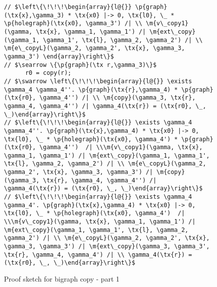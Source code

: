 \begin{figure}
\begin{lstlisting}
// $\left\{\!\!\!\begin{array}{l@{}} \p{graph}(\tx{x},\gamma_3) * \tx{x0} |-> 0, \tx{l0}, \_ * \p{holegraph}(\tx{x0}, \gamma_3') /| \\ \m{v\_copy1}(\gamma, \tx{x}, \gamma_1, \gamma_1') /| \m{ext\_copy}(\gamma_1, \gamma_1', \tx{l}, \gamma_2, \gamma_2') /| \\ \m{e\_copyL}(\gamma_2, \gamma_2', \tx{x}, \gamma_3, \gamma_3') \end{array}\right\}$
// $\searrow \{\p{graph}(\tx r,\gamma_3)\}$
      r0 = copy(r);
// $\swarrow \left\{\!\!\!\begin{array}{l@{}} \exists \gamma_4 \gamma_4''. \p{graph}(\tx{r},\gamma_4) * \p{graph}(\tx{r0}, \gamma_4'') /| \\ \m{copy}(\gamma_3, \tx{r}, \gamma_4, \gamma_4'') /| \gamma_4(\tx{r}) = (\tx{r0}, \_, \_)\end{array}\right\}$
// $\left\{\!\!\!\begin{array}{l@{}} \exists \gamma_4 \gamma_4''. \p{graph}(\tx{x},\gamma_4) * \tx{x0} |-> 0, \tx{l0}, \_ * \p{holegraph}(\tx{x0}, \gamma_4') * \p{graph}(\tx{r0}, \gamma_4'')  /| \\\m{v\_copy1}(\gamma, \tx{x}, \gamma_1, \gamma_1') /| \m{ext\_copy}(\gamma_1, \gamma_1', \tx{l}, \gamma_2, \gamma_2') /| \\ \m{e\_copyL}(\gamma_2, \gamma_2', \tx{x}, \gamma_3, \gamma_3') /| \m{copy}(\gamma_3, \tx{r}, \gamma_4, \gamma_4'') /| \gamma_4(\tx{r}) = (\tx{r0}, \_, \_)\end{array}\right\}$
// $\left\{\!\!\!\begin{array}{l@{}} \exists \gamma_4 \gamma_4'. \p{graph}(\tx{x},\gamma_4) * \tx{x0} |-> 0, \tx{l0}, \_ * \p{holegraph}(\tx{x0}, \gamma_4')  /| \\\m{v\_copy1}(\gamma, \tx{x}, \gamma_1, \gamma_1') /| \m{ext\_copy}(\gamma_1, \gamma_1', \tx{l}, \gamma_2, \gamma_2') /| \\ \m{e\_copyL}(\gamma_2, \gamma_2', \tx{x}, \gamma_3, \gamma_3') /| \m{ext\_copy}(\gamma_3, \gamma_3', \tx{r}, \gamma_4, \gamma_4') /| \\ \gamma_4(\tx{r}) = (\tx{r0}, \_, \_)\end{array}\right\}$
  \end{lstlisting}
\caption{Proof sketch for bigraph copy - part 1}
\label{fig:copy-part1}
\end{figure}

\newpage 

